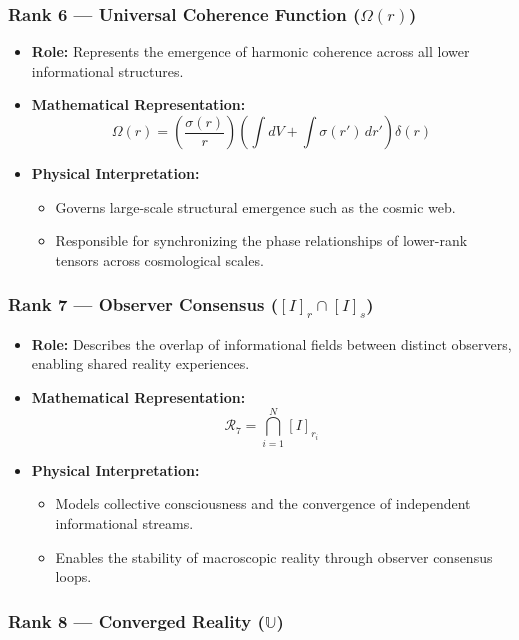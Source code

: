 \documentclass[12pt,a4paper]{article}
\begin{document}
\subsubsection*{Rank 6 — Universal Coherence Function (\(\Omega(r)\))}

\begin{itemize}
    \item \textbf{Role:} Represents the emergence of harmonic coherence across all lower informational structures.
    \item \textbf{Mathematical Representation:}
    \[
    \Omega(r) = \left( \frac{\sigma(r)}{r} \right) \left( \int dV + \int \sigma(r') \, dr' \right) \delta(r)
    \]
    \item \textbf{Physical Interpretation:} 
    \begin{itemize}
        \item Governs large-scale structural emergence such as the cosmic web.
        \item Responsible for synchronizing the phase relationships of lower-rank tensors across cosmological scales.
    \end{itemize}
\end{itemize}

\subsubsection*{Rank 7 — Observer Consensus (\([I]_r \cap [I]_s\))}

\begin{itemize}
    \item \textbf{Role:} Describes the overlap of informational fields between distinct observers, enabling shared reality experiences.
    \item \textbf{Mathematical Representation:}
    \[
    \mathcal{R}_7 = \bigcap_{i=1}^{N} [I]_{r_i}
    \]
    \item \textbf{Physical Interpretation:} 
    \begin{itemize}
        \item Models collective consciousness and the convergence of independent informational streams.
        \item Enables the stability of macroscopic reality through observer consensus loops.
    \end{itemize}
\end{itemize}

\subsubsection*{Rank 8 — Converged Reality (\(\mathbb{U}\))}
\end{document}
